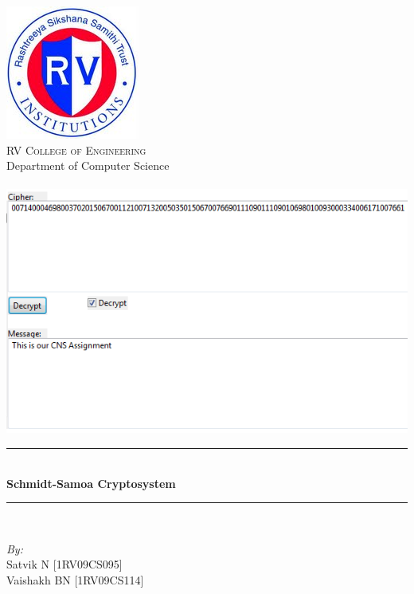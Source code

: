 \documentclass[12pt]{article} %
\newcommand{\HRule}{\rule{\linewidth}{0.5mm}}
\begin{document}
\maketitle

\begin{titlepage}

\begin{center}


\includegraphics[scale=0.75]{RVCE.png}\\[1cm]    

\textsc{\LARGE  RV College of Engineering}\\[0.5cm]
\large{Department of Computer Science}\\[1cm]
\textsc{\Large }\\[0.5cm]

\includegraphics[scale=0.75]{proj.png}\\[1cm]    

\HRule \\[0.4cm]
{  \huge\bfseries Schmidt-Samoa Cryptosystem }\\[0.4cm]

\HRule \\[1cm]

\begin{minipage}{0.8\textwidth}
\begin{flushleft} \large
\emph{By:}\\
Satvik \textsc{N} [1RV09CS095]\\
Vaishakh \textsc{BN} [1RV09CS114]\\

\end{flushleft}
\end{minipage}
\vfill

{\large}

\end{center}

\end{titlepage}
\end{document}
